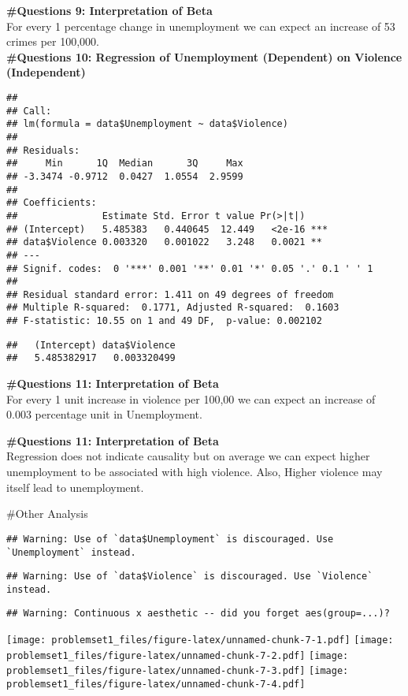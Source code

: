 \documentclass[
]{article}
\begin{document}
\textbf{\#Questions 9: Interpretation of Beta}\\
For every 1 percentage change in unemployment we can expect an increase
of 53 crimes per 100,000.\\
\textbf{\#Questions 10: Regression of Unemployment (Dependent) on
Violence (Independent) }

\begin{verbatim}
## 
## Call:
## lm(formula = data$Unemployment ~ data$Violence)
## 
## Residuals:
##     Min      1Q  Median      3Q     Max 
## -3.3474 -0.9712  0.0427  1.0554  2.9599 
## 
## Coefficients:
##               Estimate Std. Error t value Pr(>|t|)    
## (Intercept)   5.485383   0.440645  12.449   <2e-16 ***
## data$Violence 0.003320   0.001022   3.248   0.0021 ** 
## ---
## Signif. codes:  0 '***' 0.001 '**' 0.01 '*' 0.05 '.' 0.1 ' ' 1
## 
## Residual standard error: 1.411 on 49 degrees of freedom
## Multiple R-squared:  0.1771, Adjusted R-squared:  0.1603 
## F-statistic: 10.55 on 1 and 49 DF,  p-value: 0.002102
\end{verbatim}

\begin{verbatim}
##   (Intercept) data$Violence 
##   5.485382917   0.003320499
\end{verbatim}

\textbf{\#Questions 11: Interpretation of Beta}\\
For every 1 unit increase in violence per 100,00 we can expect an
increase of 0.003 percentage unit in Unemployment.

\textbf{\#Questions 11: Interpretation of Beta}\\
Regression does not indicate causality but on average we can expect
higher unemployment to be associated with high violence. Also, Higher
violence may itself lead to unemployment.

\#Other Analysis

\begin{verbatim}
## Warning: Use of `data$Unemployment` is discouraged. Use `Unemployment` instead.
\end{verbatim}

\begin{verbatim}
## Warning: Use of `data$Violence` is discouraged. Use `Violence` instead.
\end{verbatim}

\begin{verbatim}
## Warning: Continuous x aesthetic -- did you forget aes(group=...)?
\end{verbatim}

\texttt{[image: problemset1\_files/figure-latex/unnamed-chunk-7-1.pdf]}
\texttt{[image: problemset1\_files/figure-latex/unnamed-chunk-7-2.pdf]}
\texttt{[image: problemset1\_files/figure-latex/unnamed-chunk-7-3.pdf]}
\texttt{[image: problemset1\_files/figure-latex/unnamed-chunk-7-4.pdf]}
\end{document}

